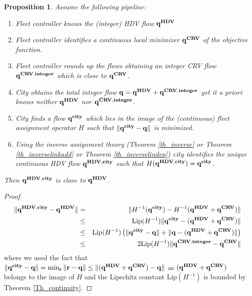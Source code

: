 \documentclass[a4paper,11pt]{article}
\newtheorem{proposition}[theorem]{Proposition}
\begin{document}
\begin{proposition}
Assume the following pipeline:
\begin{enumerate}
\item Fleet controller knows the (integer) HDV flow $\bold{q^{HDV}}$
\item Fleet controller identifies a continuous local minimizer $\bold{q^{CRV}}$ of the objective function. 
\item Fleet controller rounds up the flows obtaining an integer CRV flow $\bold{q^{CRV,integer}}$ which is close to $\bold{q^{CRV}}$. 
\item City obtains the total integer flow $\bold{q}= \bold{q^{HDV}} + \bold{q^{CRV,integer}}$ yet it a priori knows neither $\bold{q^{HDV}}$ nor $\bold{q^{CRV,integer}}$.
\item City finds a flow $\bold{{q^{city}}}$ which lies in the image of the (continuous) fleet assignment operator $H$ such that $\|{\bold{q^{city}}} - \bold{q}\|$ is minimized. 
\item Using the inverse assignment theory (Theorem \ref{th_inverse} or Theorem \ref{th_inverselinkadd} or Theorem \ref{th_inverselindep}) city identifies the unique continuous HDV flow $\bold{q^{HDV,city}}$ such that $H(\bold{q^{HDV,city}}) = {\bold{q^{city}}}$.
\end{enumerate}
Then $\bold{q^{HDV,city}}$ is close to $\bold{q^{HDV}}$.
\end{proposition}
\begin{proof}
\begin{eqnarray*}
\|\bold{q^{HDV,city}} - \bold{q^{HDV}}\| &=& \|H^{-1}(\bold{q^{city}}) - H^{-1}(\bold{q^{HDV}} + \bold{q^{CRV}})\|\\ &\le& \mbox {Lip}(H^{-1}) \|\bold{q^{city}} - (\bold{q^{HDV}} + \bold{q^{CRV}})\| \\
&\le& \mbox {Lip}(H^{-1}) \left(\|\bold{q^{city}} - \bold{q}\| + \| \bold{q} -  (\bold{q^{HDV}} + \bold{q^{CRV}})\|\right)\\
&\le& 2\mbox {Lip}(H^{-1}) \|\bold{q^{CRV, integer}} - \bold{q^{CRV}}\|
\end{eqnarray*}
where we used the fact that 
$\|\bold{q^{city}} - \bold{q}\| = \min_{\bold{r}} \|\bold{r} - \bold{q}\| \le \|(\bold{q^{HDV}} + \bold{q^{CRV}}) - \bold{q}\|$ as $(\bold{q^{HDV}} + \bold{q^{CRV}})$ belongs to the image of $H$ and the Lipschitz constant $\mbox {Lip}(H^{-1})$ is bounded by Theorem \ref{Th_continuity}.
\end{proof}
\end{document}
